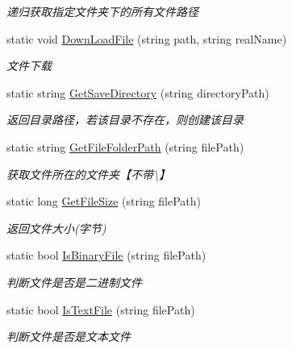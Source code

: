\begin{DoxyCompactItemize}
\begin{DoxyCompactList}\small\item\em 递归获取指定文件夹下的所有文件路径 \end{DoxyCompactList}\item 
static void \hyperlink{class_x_c_l_net_tools_1_1_file_handler_1_1_com_file_a88a411e0efbbb5117f62ae15734b5a4b}{Down\+Load\+File} (string path, string real\+Name)
\begin{DoxyCompactList}\small\item\em 文件下载 \end{DoxyCompactList}\item 
static string \hyperlink{class_x_c_l_net_tools_1_1_file_handler_1_1_com_file_a7fd47f5dd58f607c4fad3bb596f2d7b6}{Get\+Save\+Directory} (string directory\+Path)
\begin{DoxyCompactList}\small\item\em 返回目录路径，若该目录不存在，则创建该目录 \end{DoxyCompactList}\item 
static string \hyperlink{class_x_c_l_net_tools_1_1_file_handler_1_1_com_file_a54bcd222d9060ea6ee9d64264caf9939}{Get\+File\+Folder\+Path} (string file\+Path)
\begin{DoxyCompactList}\small\item\em 获取文件所在的文件夹【不带\textquotesingle{}\textbackslash{}\textquotesingle{}】 \end{DoxyCompactList}\item 
static long \hyperlink{class_x_c_l_net_tools_1_1_file_handler_1_1_com_file_a14816af3acf91a20ded5325a889f8341}{Get\+File\+Size} (string file\+Path)
\begin{DoxyCompactList}\small\item\em 返回文件大小(字节) \end{DoxyCompactList}\item 
static bool \hyperlink{class_x_c_l_net_tools_1_1_file_handler_1_1_com_file_a9e413978309f59720a38228ad9c1aaa2}{Is\+Binary\+File} (string file\+Path)
\begin{DoxyCompactList}\small\item\em 判断文件是否是二进制文件 \end{DoxyCompactList}\item 
static bool \hyperlink{class_x_c_l_net_tools_1_1_file_handler_1_1_com_file_afddfff3c4a196399bc033df2b017b16c}{Is\+Text\+File} (string file\+Path)
\begin{DoxyCompactList}\small\item\em 判断文件是否是文本文件 \end{DoxyCompactList}\item 

\end{DoxyCompactItemize}
